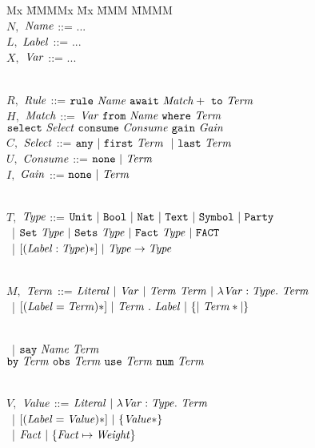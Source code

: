\begin{figure}
\begin{tabbing}
Mx \= MMMMx \= Mx \= MMM \= MMMM \kill
\\  $N,$ \> $\mathit{Name}$    \> ::= \> ...
\\  $L,$ \> $\mathit{Label}$   \> ::= \> ...
\\  $X,$ \> $\mathit{Var}$     \> ::= \> ...

\\[1ex]
    $R,$ \> $\mathit{Rule}$    \> ::= \> $\texttt{rule}~ \mathit{Name}~ \texttt{await}~ \mathit{Match}+~ \texttt{to}~ \mathit{Term}$
\\[0.5ex]
    $H,$ \> $\mathit{Match}$   \> ::= \> $\mathit{Var}~ \texttt{from}~ \mathit{Name}~ \texttt{where}~ \mathit{Term}$
\\      \>              \>     \> \hspace{1.6em}
                                  $\texttt{select}~ \mathit{Select}~ \texttt{consume}~ \mathit{Consume}~ \texttt{gain}~ \mathit{Gain}$
\\[0.5ex]
   $C,$ \> $\mathit{Select}$   \> ::= \> $\texttt{any}~ |~ \texttt{first}~ \mathit{Term}~ ~|~ \texttt{last}~ \mathit{Term}$
\\ $U,$ \> $\mathit{Consume}$  \> ::= \> $\texttt{none}~ |~ \mathit{Term}$
\\ $I,$ \> $\mathit{Gain}$     \> ::= \> $\texttt{none}~ |~ \mathit{Term}$

\\[1ex]
   $T,$ \> $\mathit{Type}$
        \> ::= \> $\texttt{Unit}~ |~ \texttt{Bool}~ |~ \texttt{Nat}~ |~ \texttt{Text}~ |~ \texttt{Symbol}~ |~ \texttt{Party}$
\\ \>   \> ~|  \> $\texttt{Set}~ \mathit{Type}~ |~ \texttt{Sets}~ \mathit{Type}~ |~ \texttt{Fact}~ \mathit{Type}~ |~ \texttt{FACT}$
\\ \>   \> ~|  \> $[ (\mathit{Label} : \mathit{Type})* ] ~|~ \mathit{Type} \to \mathit{Type}~$

\\[1ex]
  $M,$  \> $\mathit{Term}$
        \> ::=  \> $\mathit{Literal}~ |~ \mathit{Var}~ |~ \mathit{Term}~ \mathit{Term}~ |~ \lambda \mathit{Var} : \mathit{Type}.~ \mathit{Term}$
\\ \>   \> ~|   \> $[ (\mathit{Label} = \mathit{Term})* ]~ |~ \mathit{Term}~ .~ \mathit{Label} ~|~ \{|~ \mathit{Term}* |\}$

\\[0.5ex] \>    \> ~|  \> $\texttt{say}~ \mathit{Name}~ \mathit{Term}~$
\\        \>    \>     \> \hspace{0.5em} $\texttt{by}~ \mathit{Term}~ \texttt{obs}~ \mathit{Term}~ \texttt{use}~ \mathit{Term}~ \texttt{num}~ \mathit{Term}$

\\[1ex]
  $V,$  \> $\mathit{Value}$
        \> ::=  \> $\mathit{Literal}~ |~ \lambda \mathit{Var} : \mathit{Type}.~ \mathit{Term}$
\\      \>      \> ~|  \> $[ (\mathit{Label} = \mathit{Value})* ] ~|~ \{ \mathit{Value}* \}$
\\      \>      \> ~|  \> $\mathit{Fact} ~|~ \{ \mathit{Fact} \mapsto \mathit{Weight} \}$


\end{tabbing}
\end{figure}

